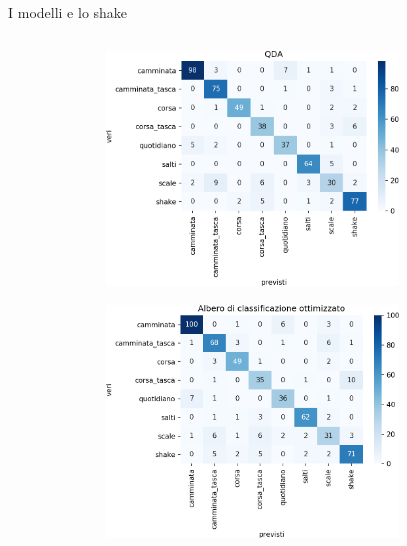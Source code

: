 \documentclass{beamer}
\begin{document}
\begin{frame}{I modelli e lo shake}
\begin{columns}[T]
\begin{column}{.5\textwidth}
\begin{figure}[H]
\end{figure}
\end{column}%
\hfill%
\begin{column}{.5\textwidth}
\begin{figure}[H]
\includegraphics[width=0.8\textwidth]{../figure/confusionMatrix-QDA.png}
\end{figure}
\begin{figure}[H]
\includegraphics[width=0.8\textwidth]{../figure/confusionMatrix-Tree.png}
\end{figure}
\end{column}%
\end{columns}
\end{frame}
\end{document}
